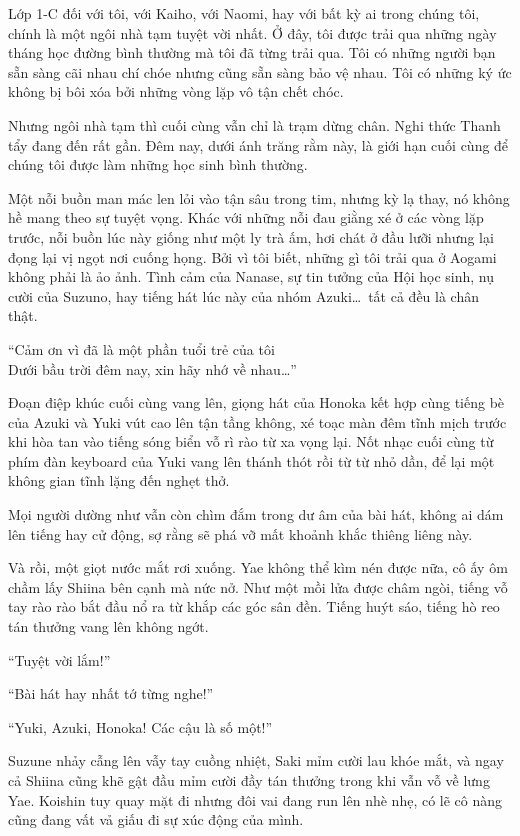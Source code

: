 \documentclass[../main.tex]{subfiles}
\begin{document}
Lớp 1-C đối với tôi, với Kaiho, với Naomi, hay với bất kỳ ai trong chúng tôi, chính là một ngôi nhà tạm tuyệt vời nhất. Ở đây, tôi được trải qua những ngày tháng học đường bình thường mà tôi đã từng trải qua. Tôi có những người bạn sẵn sàng cãi nhau chí chóe nhưng cũng sẵn sàng bảo vệ nhau. Tôi có những ký ức không bị bôi xóa bởi những vòng lặp vô tận chết chóc.

Nhưng ngôi nhà tạm thì cuối cùng vẫn chỉ là trạm dừng chân. Nghi thức Thanh tẩy đang đến rất gần. Đêm nay, dưới ánh trăng rằm này, là giới hạn cuối cùng để chúng tôi được làm những học sinh bình thường.

Một nỗi buồn man mác len lỏi vào tận sâu trong tim, nhưng kỳ lạ thay, nó không hề mang theo sự tuyệt vọng. Khác với những nỗi đau giằng xé ở các vòng lặp trước, nỗi buồn lúc này giống như một ly trà ấm, hơi chát ở đầu lưỡi nhưng lại đọng lại vị ngọt nơi cuống họng. Bởi vì tôi biết, những gì tôi trải qua ở Aogami không phải là ảo ảnh. Tình cảm của Nanase, sự tin tưởng của Hội học sinh, nụ cười của Suzuno, hay tiếng hát lúc này của nhóm Azuki\dots\ tất cả đều là chân thật.

\begin{center}
  ``Cảm ơn vì đã là một phần tuổi trẻ của tôi\\
  Dưới bầu trời đêm nay, xin hãy nhớ về nhau\dots''
\end{center}

Đoạn điệp khúc cuối cùng vang lên, giọng hát của Honoka kết hợp cùng tiếng bè của Azuki và Yuki vút cao lên tận tầng không, xé toạc màn đêm tĩnh mịch trước khi hòa tan vào tiếng sóng biển vỗ rì rào từ xa vọng lại. Nốt nhạc cuối cùng từ phím đàn keyboard của Yuki vang lên thánh thót rồi từ từ nhỏ dần, để lại một không gian tĩnh lặng đến nghẹt thở.

Mọi người dường như vẫn còn chìm đắm trong dư âm của bài hát, không ai dám lên tiếng hay cử động, sợ rằng sẽ phá vỡ mất khoảnh khắc thiêng liêng này.

Và rồi, một giọt nước mắt rơi xuống. Yae không thể kìm nén được nữa, cô ấy ôm chầm lấy Shiina bên cạnh mà nức nở. Như một mồi lửa được châm ngòi, tiếng vỗ tay rào rào bắt đầu nổ ra từ khắp các góc sân đền. Tiếng huýt sáo, tiếng hò reo tán thưởng vang lên không ngớt.

``Tuyệt vời lắm!''

``Bài hát hay nhất tớ từng nghe!''

``Yuki, Azuki, Honoka! Các cậu là số một!''

Suzune nhảy cẫng lên vẫy tay cuồng nhiệt, Saki mỉm cười lau khóe mắt, và ngay cả Shiina cũng khẽ gật đầu mỉm cười đầy tán thưởng trong khi vẫn vỗ về lưng Yae. Koishin tuy quay mặt đi nhưng đôi vai đang run lên nhè nhẹ, có lẽ cô nàng cũng đang vất vả giấu đi sự xúc động của mình.
\end{document}

